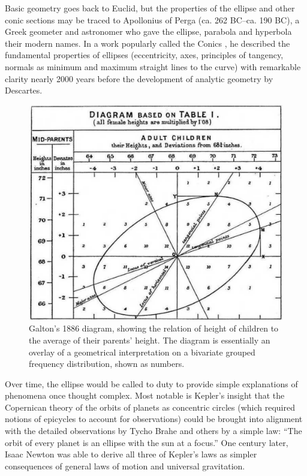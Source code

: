 \documentclass[11pt]{article}%
\begin{document}
Basic geometry goes back to Euclid, but the properties of the ellipse and  other
conic sections may be traced to Apollonius  of Perga (ca. 262 BC--ca. 190 BC),  a
Greek geometer and astronomer who gave the ellipse, parabola and hyperbola their
modern names. In a work popularly called the Conics \citep{Boyer:91}, he  described
the  fundamental  properties  of  ellipses  (eccentricity,  axes,  principles of
tangency,  normals as  minimum and  maximum straight  lines to  the curve)  with
remarkable clarity nearly 2000 years before the development of analytic geometry
by Descartes.

\begin{figure}[htb]
  \centering
  \includegraphics[width=.75\textwidth]{fig/galton-corr}
  \caption{Galton's 1886 diagram, showing the relation of height of children
to the average of their parents' height. The diagram is essentially an overlay
of a geometrical interpretation on a bivariate grouped frequency distribution, shown
as numbers.}%
  \label{fig:galton-corr}
\end{figure}

Over time, the ellipse would be called to duty to provide simple explanations of
phenomena  once thought  complex.  Most  notable is  Kepler's insight  that the
Copernican theory of the orbits of planets as concentric circles (which required
notions  of  epicycles  to  account  for  observations)  could  be  brought into
alignment with the detailed observations by  Tycho Brahe and others by a  simple
law: ``The orbit  of every planet  is an ellipse  with the sun  at a focus.''  One
century later, Isaac  Newton was able  to derive all  three of Kepler's  laws as
simpler consequences of general laws of motion and universal gravitation.
\end{document}
